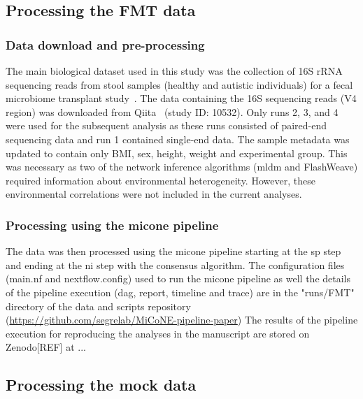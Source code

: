   \subsection*{Processing the FMT data}

    \subsubsection*{Data download and pre-processing}
    The main biological dataset used in this study was the collection of 16S rRNA sequencing reads from stool samples (healthy and autistic individuals) for a fecal microbiome transplant study~\cite{Kang2017}.
    The data containing the 16S sequencing reads (V4 region) was downloaded from Qiita~\cite{qiita} (study ID: 10532).
    Only runs 2, 3, and 4 were used for the subsequent analysis as these runs consisted of paired-end sequencing data and run 1 contained single-end data.
    The sample metadata was updated to contain only BMI, sex, height, weight and experimental group.
    This was necessary as two of the network inference algorithms (\ac{mldm} and FlashWeave) required information about environmental heterogeneity.
    However, these environmental correlations were not included in the current analyses.

    \subsubsection*{Processing using the \ac{micone} pipeline}
    The data was then processed using the \ac{micone} pipeline starting at the \ac{sp} step and ending at the \ac{ni} step with the consensus algorithm.
    The configuration files (main.nf and nextflow.config) used to run the \ac{micone} pipeline as well the details of the pipeline execution (dag, report, timeline and trace) are in the "runs/FMT" directory of the data and scripts repository (\href{https://github.com/segrelab/MiCoNE-pipeline-paper}{https://github.com/segrelab/MiCoNE-pipeline-paper})
    The results of the pipeline execution for reproducing the analyses in the manuscript are stored on Zenodo[REF] at ...

  \subsection*{Processing the mock data}

